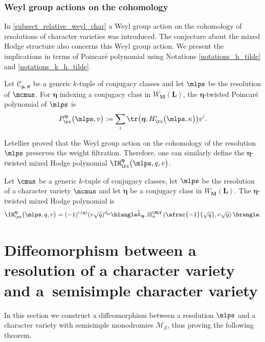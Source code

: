 \subsubsection{Weyl group actions on the cohomology}
In \ref{subsect_relative_weyl_char} a Weyl group action on the cohomology of resolutions of character varieties was introduced. The conjecture about the mixed Hodge structure also concerns this Weyl group action. We present the implications in terms of Poincaré polynomial using Notations \ref{notations_h_tilde} and \ref{notations_k_h_tilde}.
\begin{definition}\label{def_twisted_Poincare}
Let $\mathcal{C}_{\boldsymbol{\mu},\boldsymbol{\sigma}}$ be a generic $k$-tuple of conjugacy classes and let $\mlps$ be the resolution of $\mcmus$. For $\boldsymbol{\eta}$ indexing a conjugacy class in $W_{\boldsymbol{M}}(\boldsymbol{L})$, the $\boldsymbol{\eta}$-twisted Poincaré polynomial of $\mlps$ is
\[
P_{\rc}^{\boldsymbol{\eta}}\bigl(\mlps,v\bigr) := \sum_{i} \tr\bigl(\boldsymbol{\eta}, H_\rc^i\bigl(\mlps, \kappa\bigr)\bigr)v^i.
\]
\end{definition}

Letellier proved that the Weyl group action on the cohomology of the resolution $\mlps$ preserves the weight filtration. Therefore, one can similarly define the $\boldsymbol{\eta}$\nobreakdash-twisted mixed Hodge polynomial $\IH_\rc^{\boldsymbol{\eta}}\bigl(\mlps,q,v\bigr)$.
\begin{conjecture}\label{conj_twisted_mixed_resol}
Let $\cmus$ be a generic $k$-tuple of conjugacy classes, let $\mlps$ be the resolution of a character variety $\mcmus$ and let $\boldsymbol{\eta}$ be a conjugacy class in $W_{\boldsymbol{M}}(\boldsymbol{L})$. The $\boldsymbol{\eta}$-twisted mixed Hodge polynomial is
\[
\IH_\rc^{\boldsymbol{\eta}}\bigl(\mlps,q,v\bigr) = (-1)^{r(\boldsymbol{\eta})}(v\sqrt{q})^{d_{\boldsymbol{\mu}}} \blangle \widetilde{h}_{\boldsymbol{\eta}}, \mathbb{H}^{\HLV}_n \left(\sfrac{-1}{\sqrt{q}},v \sqrt{q}\right)\brangle.
\]

\end{conjecture}

\section{Diffeomorphism between a resolution of a character variety and a~semisimple character variety}\label{sect_diffeo_res}
In this section we construct a diffeomorphism between a resolution $\mlps$ and a character variety with semisimple monodromies $\mathcal{M}_{\boldsymbol{\mathcal{S}}}$, thus proving the following theorem.


